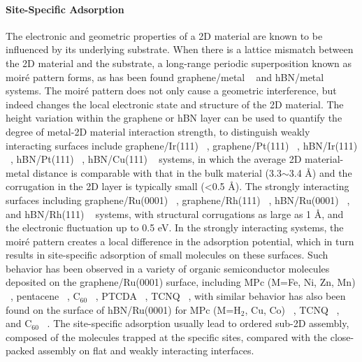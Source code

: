 \paragraph{Site-Specific Adsorption}
\label{sec:org87b0c12}

The electronic and geometric properties of a 2D material are known to be
influenced by its underlying substrate. When there is a lattice
mismatch between the 2D material and the substrate, a long-range
periodic superposition known as moiré pattern forms, as has been
found graphene/metal ~\autocite{Hamalainen_2013_moire_gr} and hBN/metal
~\autocite{Schulz_2014_hBN_moire} systems.  The
moiré pattern does not only cause a geometric interference, but
indeed changes the local electronic state and structure of the 2D
material.
%
The height variation within the graphene or hBN layer can be used to
quantify the degree of metal-2D material interaction strength, to
distinguish weakly interacting surfaces include graphene/Ir(111)
~\autocite{Pletikosi_2009_gr_Ir,Busse_2011_Gr_Ir,Hamalainen_2013_moire_gr},
graphene/Pt(111) ~\autocite{Sutter_2009_Gr_Pt}, hBN/Ir(111)
~\autocite{Schulz_2014_hBN_moire}, hBN/Pt(111) ~\autocite{Cavar_2008_hBN_Pt},
hBN/Cu(111) ~\autocite{Joshi_2012_hBN_Cu} systems, in which the average 2D
material-metal distance is comparable with that in the bulk material
(3.3$\sim{}$3.4 \AA{}) and the corrugation in the 2D layer is
typically small (<0.5 \AA{}). The strongly interacting surfaces
including graphene/\allowbreak{}Ru(0001)
~\autocite{Moritz_2010_gr_Ru,Sutter_2008_gr_Ru}, graphene/Rh(111)
~\autocite{Wang_2010_gr_Rh}, hBN/Ru(0001) ~\autocite{Wang_2010_gr_Rh}, and
hBN/Rh(111) ~\autocite{Dil_2008_hBN_Rh} systems, with structural
corrugations as large as 1 \AA{}, and the electronic fluctuation up to
0.5 eV. In the strongly interacting systems, the moiré pattern creates
a local difference in the adsorption potential, which in turn results
in site-specific adsorption of small molecules on these surfaces. Such
behavior has been observed in a variety of organic semiconductor
molecules deposited on the graphene/\allowbreak{}Ru(0001) surface,
including MPc (M=Fe, Ni, Zn, Mn)
~\autocite{Mao_2009_Pc_gr_kagome,Zhang_2011_FePc_gr}, pentacene
~\autocite{Zhou_2013_penta_gr_Ru}, C\(_{\text{60}}\)
~\autocite{Li_2012_c60_gr_Ru}, PTCDA ~\autocite{Zhou_2011_PTCDA_gr_Ru}, TCNQ
~\autocite{Maccariello_2014_TCNQ_gr_Ru}, with similar behavior has also
been found on the surface of hBN/Ru(0001) for MPc (M=H\(_{\text{2}}\),
Cu, Co) ~\autocite{Dil_2008_hBN_Rh,Jarvinen_2014_MPc_hBN_Ru}, TCNQ
~\autocite{Joshi_2014_TCNQ_hBN}, and C\(_{\text{60}}\)
~\autocite{Corso_2004_C60_hBN}. The site-specific adsorption usually lead
to ordered sub-2D assembly, composed of the molecules trapped at the
specific sites, compared with the close-packed assembly on flat and
weakly interacting interfaces.

